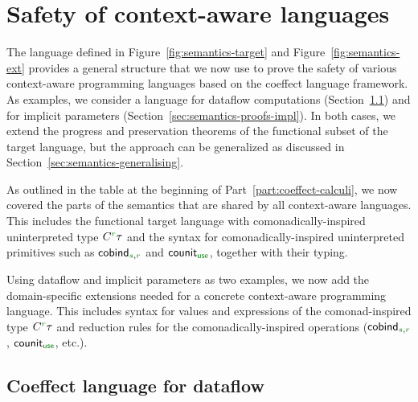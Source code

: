 %
%

\section{Safety of context-aware languages}
\label{sec:semantics-proofs}

The language defined in Figure~\ref{fig:semantics-target} and Figure~\ref{fig:semantics-ext}
provides a general structure that we now use to prove the safety of various context-aware
programming languages based on the coeffect language framework. As examples, we consider a language
for dataflow computations (Section~\ref{sec:semantics-proofs-df}) and for implicit parameters
(Section~\ref{sec:semantics-proofs-impl}). In both cases, we extend the progress and preservation
theorems of the functional subset of the target language, but the approach can be generalized as
discussed in Section~\ref{sec:semantics-generalising}.

As outlined in the table at the beginning of Part~\ref{part:coeffect-calculi}, we now covered the
parts of the semantics that are shared by all context-aware languages. This includes the functional
target language with comonadically-inspired uninterpreted type $\ctyp{\cclrd{r}}{\tau}$ and the
syntax for comonadically-inspired uninterpreted primitives such as
$\ident{cobind}_{\cclrd{s},\cclrd{r}}$ and $\ident{counit}_{\cunit}$, together with their typing.

Using dataflow and implicit parameters as two examples, we now add the domain-specific extensions
needed for a concrete context-aware programming language. This includes syntax for values and
expressions of the comonad-inspired type $\ctyp{\cclrd{r}}{\tau}$ and reduction rules for the
comonadically-inspired operations ($\ident{cobind}_{\cclrd{s},\cclrd{r}}$, $\ident{counit}_{\cunit}$, etc.).


\subsection{Coeffect language for dataflow}
\label{sec:semantics-proofs-df}

